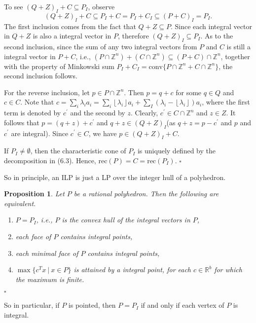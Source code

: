 \documentclass{article}
\newtheorem{proposition}[theorem]{Proposition}
\newenvironment{proof}{{\it Proof.}}{ \hfill $\square$}
\def\R{{\mathbb R}}
\def\Z{{\mathbb Z}}
\begin{document}
\begin{proof}
To see $(Q+Z)_I+C\subseteq P_I$, observe
\begin{equation}
(Q+Z)_I+C\subseteq P_I+C=P_I+C_I\subseteq (P+C)_I=P_I.
\end{equation}
The first inclusion comes from the fact that $Q+Z\subseteq P$. Since each integral vector in $Q+Z$ is also a integral vector in $P$, therefore $(Q+Z)_I\subseteq P_I$. As to the second inclusion, since the sum of any two integral vectors from $P$ and $C$ is still a integral vector in $P+C$, i.e., $(P\cap \Z^n)+(C\cap \Z^n) \subseteq (P+C)\cap \Z^n$, together with the property of Minkowski sum $P_I + C_I=\mbox{conv}\{P\cap \Z^n + C\cap \Z^n\}$, the second inclusion follows.

For the reverse inclusion, let $p\in P\cap\Z^n$. Then $p=q+c$ for some $q\in Q$ and $c\in C$. Note that $c=\sum_i \lambda_i a_i=\sum_i\left\lfloor \lambda_i \right\rfloor  a_i+\sum_I(\lambda_i-\left\lfloor \lambda_i \right\rfloor)a_i$, where the first term is denoted by $c^\prime$ and the second by $z$. Clearly, $c^\prime \in C\cap \Z^n$ and $z\in Z$. It follows that $p=(q+z)+c^\prime$ and $q+z\in (Q+Z)_I$(as $q+z=p-c^\prime$ and $p$ and $c^\prime$ are integral). Since $c^\prime\in C$, we have $p\in (Q+Z)_I+C$.

If $P_I\not=\emptyset$, then the characteristic cone of $P_I$ is uniquely defined by the decomposition in (6.3). Hence, $\mbox{rec}(P)=C=\mbox{rec}(P_I)$.
\end{proof}

So in principle, an ILP is just a LP over the integer hull of a polyhedron.


\begin{proposition}
Let $P$ be a rational polyhedron. Then the following  are equivalent.
\begin{enumerate}
\item[(1)] $P=P_I$, i.e., $P$ is the convex hull of the integral vectors in $P$,
\item[(2)] each face of $P$ contains integral points,
\item[(3)] each minimal face of $P$ contains integral points,
\item[(4)] $\max\{c^T x~|~x\in P\}$ is attained by a integral point, for each $c\in\R^b$ for which the maximum is finite.
\end{enumerate}
\end{proposition}
\begin{proof}
\end{proof}


So in particular, if $P$ is pointed, then $P=P_I$ if and only if each vertex of $P$ is integral.
\end{document}
